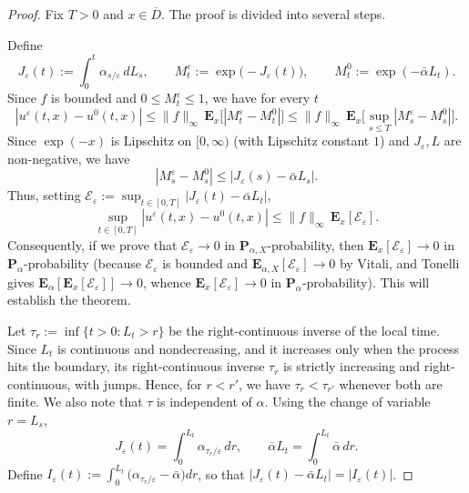 \documentclass[11pt]{amsart}
\theoremstyle{plain}
\theoremstyle{definition}
\theoremstyle{remark}
\begin{document}
\begin{proof}
	Fix $T>0$ and $x\in\overline D$. The proof is divided into several steps.
	
	Define 
	\[
	J_\varepsilon(t):=\int_0^t \alpha_{s/\varepsilon}\,dL_s,\qquad 
	M_t^\varepsilon:=\exp\bigl(-J_\varepsilon(t)\bigr),\qquad 
	M_t^0:=\exp(-\bar\alpha L_t).
	\]
	Since $f$ is bounded and $0\le M_t^\varepsilon \le1$, we have for every $t$
	\[
	|u^\varepsilon(t,x)-u^0(t,x)|\le \|f\|_\infty\,\mathbf E_x\bigl[|M_t^\varepsilon-M_t^0|\bigr]
	\le \|f\|_\infty\,\mathbf E_x\bigl[\sup_{s\le T}|M_s^\varepsilon-M_s^0|\bigr].
	\]
	Since \(\exp(-x)\) is Lipschitz on $[0,\infty)$ (with Lipschitz constant $1$) and \(J_\varepsilon, L\) are non-negative, we have
	\[
	|M_s^\varepsilon-M_s^0|\le |J_\varepsilon(s)-\bar\alpha L_s|.
	\]
	Thus, setting $\mathcal E_\varepsilon:=\sup_{t\in[0,T]}|J_\varepsilon(t)-\bar\alpha L_t|$,
	\[
	\sup_{t\in[0,T]}|u^\varepsilon(t,x)-u^0(t,x)|\le \|f\|_\infty\,\mathbf E_x[\mathcal E_\varepsilon].
	\]
	Consequently, if we prove that $\mathcal E_\varepsilon\to0$ in $\mathbf P_{\alpha,X}$-probability,
	then $\mathbf E_x[\mathcal E_\varepsilon]\to0$ in $\mathbf P_\alpha$-probability (because $\mathcal E_\varepsilon$ is bounded and $\mathbf E_{\alpha,X}[\mathcal E_\varepsilon]\to0$ by Vitali, and Tonelli gives $\mathbf E_\alpha[\mathbf E_x[\mathcal E_\varepsilon]]\to0$, whence $\mathbf E_x[\mathcal E_\varepsilon]\to0$ in $\mathbf P_\alpha$-probability). This will establish the theorem.
	
		Let $\tau_r:=\inf\{t>0:L_t>r\}$ be the right-continuous inverse of the local time.
	Since $L_t$ is continuous and nondecreasing, and it increases only when the process hits the boundary, its right-continuous inverse $\tau_r$ is strictly increasing and right-continuous, with jumps. 
	Hence, for $r<r'$, we have $\tau_r<\tau_{r'}$ whenever both are finite. We also note that \(\tau\) is independent of $\alpha$.
	Using the change of variable $r=L_s$,
	\[
	J_\varepsilon(t)=\int_0^{L_t}\alpha_{\tau_r/\varepsilon}\,dr,\qquad 
	\bar\alpha L_t = \int_0^{L_t}\bar\alpha\,dr.
	\]
	Define $I_\varepsilon(t):=\int_0^{L_t}\bigl(\alpha_{\tau_r/\varepsilon}-\bar\alpha\bigr)dr$,
	so that $|J_\varepsilon(t)-\bar\alpha L_t|=|I_\varepsilon(t)|$.
	

\end{proof}
\end{document}
